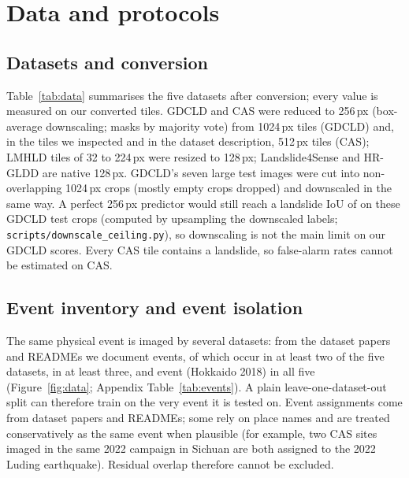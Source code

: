 \documentclass[11pt]{article}
\newcommand{\iou}{IoU}
\begin{document}
\section{Data and protocols}\label{sec:data}
\subsection{Datasets and conversion}
Table~\ref{tab:data} summarises the five datasets after conversion; every value is measured on our converted tiles. GDCLD and CAS were reduced to 256\,px (box-average downscaling; masks by majority vote) from 1024\,px tiles (GDCLD) and, in the tiles we inspected and in the dataset description, 512\,px tiles (CAS); LMHLD tiles of 32 to 224\,px were resized to 128\,px; Landslide4Sense and HR-GLDD are native 128\,px. GDCLD's seven large test images were cut into non-overlapping 1024\,px crops (mostly empty crops dropped) and downscaled in the same way. A perfect 256\,px predictor would still reach a landslide \iou{} of \CeilIou{} on these GDCLD test crops (computed by upsampling the downscaled labels; \texttt{scripts/downscale\_ceiling.py}), so downscaling is not the main limit on our GDCLD scores. Every CAS tile contains a landslide, so false-alarm rates cannot be estimated on CAS.

\begin{table}[t]\centering\small
\resizebox{\textwidth}{!}{}
\caption{Datasets after conversion. Landslide pixels are the share of landslide pixels in the converted masks (not the share of samples quoted in some dataset papers). ``Events/regions'' counts events or regions identifiable from the files shipped; for GDCLD only the test crops carry an event. CAS ships no split; we use a deterministic region-level split.}\label{tab:data}
\end{table}

\subsection{Event inventory and event isolation}
The same physical event is imaged by several datasets: from the dataset papers and READMEs we document \EvTotal{} events, of which \EvTwoPlus{} occur in at least two of the five datasets, \EvThreePlus{} in at least three, and \EvAllFive{} event (Hokkaido 2018) in all five (Figure~\ref{fig:data}; Appendix Table~\ref{tab:events}). A plain leave-one-dataset-out split can therefore train on the very event it is tested on. Event assignments come from dataset papers and READMEs; some rely on place names and are treated conservatively as the same event when plausible (for example, two CAS sites imaged in the same 2022 campaign in Sichuan are both assigned to the 2022 Luding earthquake). Residual overlap therefore cannot be excluded.
\end{document}
